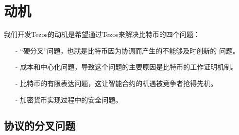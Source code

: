 \documentclass[letterpaper]{article}
\begin{document}
\section{动机}
我们开发Tezos的动机是希望通过Tezos来解决比特币\cite{Bitcoin}的四个问题：

\begin{itemize}
\item[-] ``硬分叉''问题，也就是比特币因为协调而产生的不能够及时创新的
  问题。
\item[-] 成本和中心化问题，导致这个问题的主要原因是比特币的工作证明机制。
\item[-] 比特币的有限表达问题，这让智能合约的机遇被竞争者抢得先机。
\item[-] 加密货币实现过程中的安全问题。
\end{itemize}

\subsection{协议的分叉问题}

\end{document}
